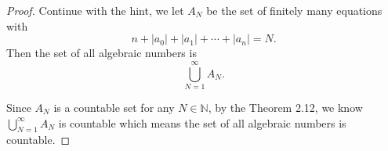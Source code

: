 \begin{Exercise}
\begin{proof}
Continue with the hint, we let $A_N$ be the set of finitely many equations with
$$
n+|a_0|+|a_1|+\cdots+|a_n| = N.
$$
Then the set of all algebraic numbers is 
$$
\bigcup_{N=1}^{\infty}A_N.
$$

Since $A_N$ is a countable set for any $N\in\mathbb{N}$, by the Theorem 2.12, we know $\bigcup_{N=1}^{\infty}A_N$ is countable which means the set of all algebraic numbers is countable.
\end{proof}
\end{Exercise}